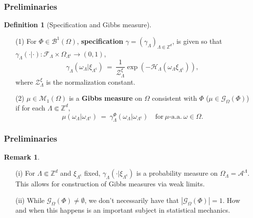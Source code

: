 \documentclass{beamer}
\newcommand{\A}{\mathcal{A}}
\newcommand{\BB}{\mathscr{B}}
\renewcommand{\c}{\mathsf{c}}
\newcommand{\F}{\mathcal{F}}
\newcommand{\G}{\mathcal{G}}
\renewcommand{\H}{\mathcal{H}}
\newcommand{\M}{\mathcal{M}}
\newcommand{\Z}{\mathbb{Z}}
\newcommand{\ZZ}{\mathcal{Z}}
\newcommand{\ra}{\rightarrow}
\newcommand{\pika}{\boldsymbol{\cdot}}
\newcommand{\1}{\mathbbm{1}}
\renewcommand{\c}{\mathsf{c}}
\newcommand{\5}{\vspace{0.5cm}}
\newcommand{\3}{\vspace{0.3cm}}
\theoremstyle{definition}
\newtheorem{df}[thm]{Definition}
\newtheorem{rem}[thm]{Remark}
\begin{document}
\begin{frame}
\frametitle{Preliminaries}
\begin{df}[Specification and Gibbs measure]
\begin{itemize}
	\item[(1)] For $\Phi\in\BB^1(\Omega)$, \textbf{specification} $\gamma=(\gamma_\Lambda)_{\Lambda\Subset\Z^d}$, is given so that $\gamma_\Lambda(\pika|\pika):\F_\Lambda\times\Omega_{\Lambda^\c}\ra(0,1)$,
	$$\gamma_\Lambda(\omega_\Lambda|\xi_{\Lambda^\c}) ~=~ \frac{1}{\ZZ_\Lambda^\xi}\exp(-\H_\Lambda(\omega_\Lambda\xi_{\Lambda^\c})),$$
	where $\ZZ_\Lambda^\xi$ is the normalization constant.
	\item[(2)] $\mu\in\M_1(\Omega)$ is a \textbf{Gibbs measure} on $\Omega$ consistent with $\Phi$ ($\mu\in\G_\Omega(\Phi)$) if for each $\Lambda\Subset\Z^d$,
	$$\mu(\omega_\Lambda|\omega_{\Lambda^\c}) ~=~ \gamma_\Lambda^\Phi(\omega_\Lambda|\omega_{\Lambda^\c}) \quad \text{for}~\mu\text{-a.a.}~\omega\in\Omega.$$
\end{itemize}
\end{df}
\end{frame}

\begin{frame}
\frametitle{Preliminaries}
\begin{rem}
\begin{itemize}
	\item[(i)] For $\Lambda\Subset\Z^d$ and $\xi_{\Lambda^\c}$ fixed, $\gamma_{\Lambda}(\pika|\xi_{\Lambda^\c})$ is a probability measure on $\Omega_\Lambda=\A^\Lambda$. This allows for construction of Gibbs measures via weak limits.
	\item[(ii)] While $\G_{\Omega}(\Phi)\neq \emptyset$, we don't necessarily have that $|\G_{\Omega}(\Phi)|=1$. How and when this happens is an important subject in statistical mechanics.
\end{itemize}
\end{rem}
\end{frame}

\end{document}
